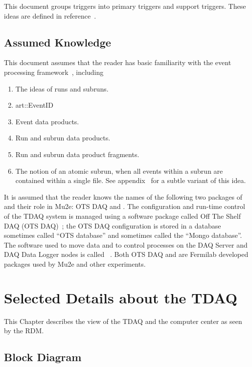 This document groups triggers into primary triggers and support triggers.
These ideas are defined in reference~\cite{TriggerSU2020}.



\section{Assumed Knowledge}

This document assumes that the reader has basic familiarity with the \art event processing framework~\cite{ARTWORDPRESS}, including

\begin{enumerate}
\item The ideas of runs and subruns.
\item {\code art::EventID}
\item Event data products.
\item Run and subrun data products.
\item Run and subrun data product fragments.
\item The notion of an atomic subrun, when all events within a subrun are contained within a single file.
      See appendix~ for a subtle variant of this idea.
\end{enumerate}

It is assumed that the reader knows the names of the following two packages of and their role in Mu2e: OTS DAQ and \artdaq.
The configuration and run-time control of the TDAQ system is managed using a software package called
Off The Shelf DAQ (OTS DAQ)~\cite{MU2EOTSDAQ};
the OTS DAQ configuration is stored in a database sometimes called ``OTS database'' and sometimes called the ``Mongo database''.
The software used to move data and to control processes on the DAQ Server and DAQ Data Logger nodes is called \artdaq~\cite{MU2EARTDAQ}.
Both OTS DAQ and \artdaq are Fermilab developed packages used by Mu2e and other experiments.

\chapter{Selected Details about the TDAQ}
\label{chap:SelectedDetails}
This Chapter describes the view of the TDAQ and the computer center as seen by the RDM.

\section{Block Diagram}
\label{sec:BlockDiagram}

